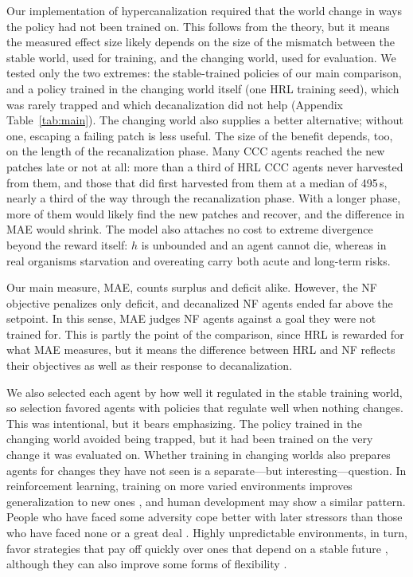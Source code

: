 \documentclass[12pt,fleqn]{article}
\begin{document}
Our implementation of hypercanalization required that the world change in ways the policy had not been trained on. This follows from the theory, but it means the measured effect size likely depends on the size of the mismatch between the stable world, used for training, and the changing world, used for evaluation. We tested only the two extremes: the stable-trained policies of our main comparison, and a policy trained in the changing world itself (one HRL training seed), which was rarely trapped and which decanalization did not help (Appendix Table~\ref{tab:main}). The changing world also supplies a better alternative; without one, escaping a failing patch is less useful. The size of the benefit depends, too, on the length of the recanalization phase. Many CCC agents reached the new patches late or not at all: more than a third of HRL CCC agents never harvested from them, and those that did first harvested from them at a median of 495\,s, nearly a third of the way through the recanalization phase. With a longer phase, more of them would likely find the new patches and recover, and the difference in MAE would shrink. The model also attaches no cost to extreme divergence beyond the reward itself: $h$ is unbounded and an agent cannot die, whereas in real organisms starvation and overeating carry both acute and long-term risks.

Our main measure, MAE, counts surplus and deficit alike. However, the NF objective penalizes only deficit, and decanalized NF agents ended far above the setpoint. In this sense, MAE judges NF agents against a goal they were not trained for. This is partly the point of the comparison, since HRL is rewarded for what MAE measures, but it means the difference between HRL and NF reflects their objectives as well as their response to decanalization. 

We also selected each agent by how well it regulated in the stable training world, so selection favored agents with policies that regulate well when nothing changes. This was intentional, but it bears emphasizing. The policy trained in the changing world avoided being trapped, but it had been trained on the very change it was evaluated on. Whether training in changing worlds also prepares agents for changes they have not seen is a separate---but interesting---question. In reinforcement learning, training on more varied environments improves generalization to new ones \citep{cobbe_quantifying_2019}, and human development may show a similar pattern. People who have faced some adversity cope better with later stressors than those who have faced none or a great deal \citep{seery_whatever_2010}. Highly unpredictable environments, in turn, favor strategies that pay off quickly over ones that depend on a stable future \citep{ellis_fundamental_2009}, although they can also improve some forms of flexibility \citep{mittal_cognitive_2015}.
\end{document}
